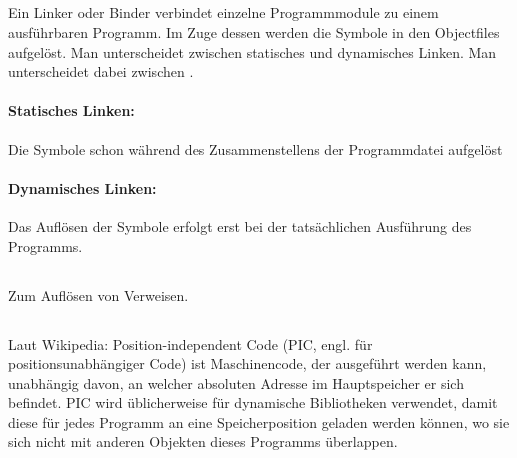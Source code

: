 \subsection{}
\begin{answer}
Ein Linker oder Binder verbindet einzelne Programmmodule zu einem ausführbaren Programm. Im Zuge dessen werden die Symbole in den Objectfiles aufgelöst. Man unterscheidet zwischen statisches und dynamisches Linken. Man unterscheidet dabei zwischen .

\paragraph*{Statisches Linken:}
Die Symbole schon während des Zusammenstellens der Programmdatei aufgelöst

\paragraph*{Dynamisches Linken:}
Das Auflösen der Symbole erfolgt erst bei der tatsächlichen Ausführung des Programms.
\end{answer}

\subsection{}
\begin{answer}
Zum Auflösen von Verweisen.
\end{answer}

\subsection{}
\begin{answer}
Laut Wikipedia: Position-independent Code (PIC, engl. für positionsunabhängiger Code) ist Maschinencode, der ausgeführt werden kann, unabhängig davon, an welcher absoluten Adresse im Hauptspeicher er sich befindet. PIC wird üblicherweise für dynamische Bibliotheken verwendet, damit diese für jedes Programm an eine Speicherposition geladen werden können, wo sie sich nicht mit anderen Objekten dieses Programms überlappen. 
\end{answer}

